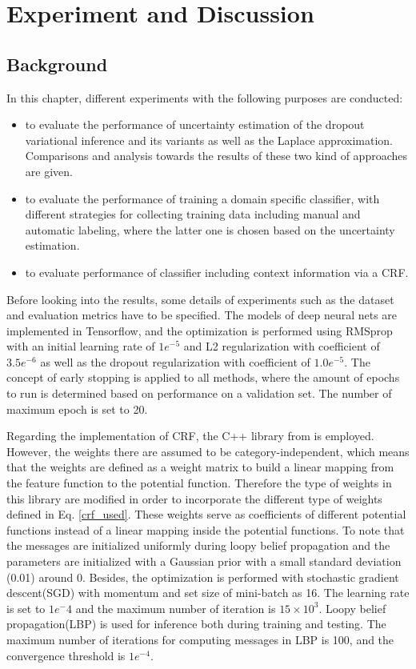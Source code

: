 
\chapter{Experiment and Discussion}

\section{Background}
In this chapter, different experiments with the following purposes are conducted:
\begin{itemize}
	\item to evaluate the performance of uncertainty estimation of the dropout variational inference and its variants as well as the Laplace approximation. Comparisons and analysis towards the results of these two kind of approaches are given.
	
	\item to evaluate the performance of training a domain specific classifier, with different strategies for collecting training data including manual and automatic labeling, where the latter one is chosen based on the uncertainty estimation.
	
	\item to evaluate performance of classifier including context information via a CRF.
\end{itemize}

Before looking into the results, some details of experiments such as the dataset and evaluation metrics have to be specified.
The models of deep neural nets are implemented in Tensorflow\cite{abadi2016tensorflow}, and the optimization is performed using RMSprop with an initial learning rate of $1e^{-5}$ and L2 regularization with coefficient of $3.5e^{-6}$ as well as the dropout regularization with coefficient of $1.0e^{-5}$.
The concept of early stopping is applied to all methods, where the amount of epochs to run is determined based on performance on a validation set.
The number of maximum epoch is set to 20. 

Regarding the implementation of CRF, the C++ library from \cite{Ruiz-Sarmiento-REACTS-2015} is employed.
However, the weights there are assumed to be category-independent, which means that the weights are defined as a weight matrix to build a linear mapping from the feature function to the potential function.
Therefore the type of weights in this library are modified in order to incorporate the different type of weights defined in Eq. \ref{crf_used}.
These weights serve as coefficients of different potential functions instead of a linear mapping inside the potential functions.
To note that the messages are initialized uniformly during loopy belief propagation and the parameters are initialized with a Gaussian prior with a small standard deviation (0.01) around 0.
Besides, the optimization is performed with stochastic gradient descent(SGD) with momentum and set size of mini-batch as 16.
The learning rate is set to $1e^-4$ and the maximum number of iteration is $15\times10^3$.
Loopy belief propagation(LBP)  is used for inference both during training and testing.
The maximum number of iterations for computing messages in LBP is 100, and the convergence threshold is $1e^{-4}$.

